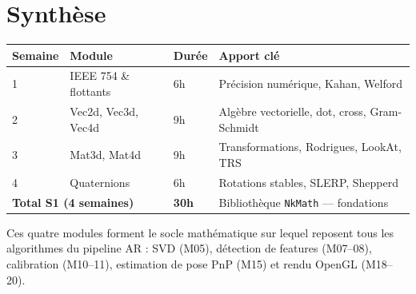 \documentclass[11pt,a4paper]{article}
\begin{document}
\section*{Synthèse}
\begin{center}
\begin{tabular}{llll}
  \toprule
  \textbf{Semaine} & \textbf{Module} & \textbf{Durée} & \textbf{Apport clé} \\
  \midrule
  1 & IEEE 754 \& flottants    & 6h & Précision numérique, Kahan, Welford \\
  2 & Vec2d, Vec3d, Vec4d      & 9h & Algèbre vectorielle, dot, cross, Gram-Schmidt \\
  3 & Mat3d, Mat4d             & 9h & Transformations, Rodrigues, LookAt, TRS \\
  4 & Quaternions              & 6h & Rotations stables, SLERP, Shepperd \\
  \midrule
  \multicolumn{2}{l}{\textbf{Total S1 (4 semaines)}} & \textbf{30h} & Bibliothèque \texttt{NkMath} — fondations \\
  \bottomrule
\end{tabular}
\end{center}

Ces quatre modules forment le socle mathématique sur lequel reposent tous les algorithmes du
pipeline AR : SVD (M05), détection de features (M07–08), calibration (M10–11), estimation de
pose PnP (M15) et rendu OpenGL (M18–20).
\end{document}

